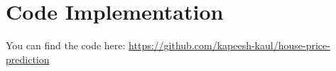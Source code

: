 \section{Code Implementation}
You can find the code here:
\url{https://github.com/kapeesh-kaul/house-price-prediction}